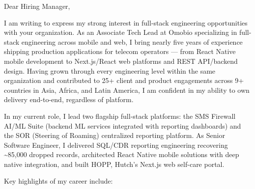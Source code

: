 \documentclass[11pt]{article}
\begin{document}

Dear Hiring Manager,

I am writing to express my strong interest in full-stack engineering opportunities with your organization. As an Associate Tech Lead at Omobio specializing in full-stack engineering across mobile and web, I bring nearly five years of experience shipping production applications for telecom operators --- from React Native mobile development to Next.js/React web platforms and REST API/backend design. Having grown through every engineering level within the same organization and contributed to 25+ client and product engagements across 9+ countries in Asia, Africa, and Latin America, I am confident in my ability to own delivery end-to-end, regardless of platform.

In my current role, I lead two flagship full-stack platforms: the SMS Firewall AI/ML Suite (backend ML services integrated with reporting dashboards) and the SOR (Steering of Roaming) centralized reporting platform. As Senior Software Engineer, I delivered SQL/CDR reporting engineering recovering \textasciitilde85,000 dropped records, architected React Native mobile solutions with deep native integration, and built HOPP, Hutch's Next.js web self-care portal.

Key highlights of my career include:

\begin{clitems}
  \item {}
  \item {}
  \item {}
  \item {}
\end{clitems}
\end{document}
